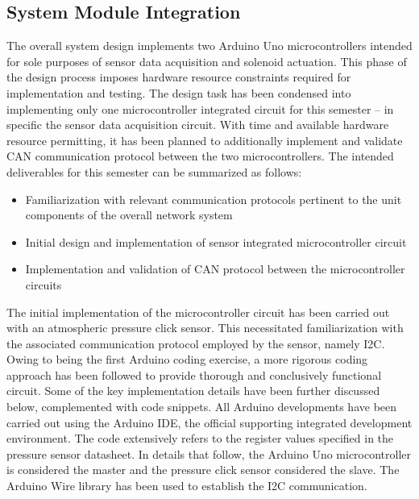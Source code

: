 \documentclass{article}
\begin{document}
\subsection{System Module Integration}
\begin{flushleft}
The overall system design implements two Arduino Uno microcontrollers intended for sole purposes of sensor data acquisition and solenoid actuation. This phase of the design process imposes hardware resource constraints required for implementation and testing. The design task has been condensed into implementing only one microcontroller integrated circuit for this semester – in specific the sensor data acquisition circuit. With time and available hardware resource permitting, it has been planned to additionally implement and validate CAN communication protocol between the two microcontrollers. The intended deliverables for this semester can be summarized as follows:
\end{flushleft}

\begin{itemize}
  \item Familiarization with relevant communication protocols pertinent to the unit components of the overall network system
  \item Initial design and implementation of sensor integrated microcontroller circuit
  \item Implementation and validation of CAN protocol between the microcontroller circuits
\end{itemize}

\begin{flushleft}
The initial implementation of the microcontroller circuit has been carried out with an atmospheric pressure click sensor. This necessitated familiarization with the associated communication protocol employed by the sensor, namely I2C. Owing to being the first Arduino coding exercise, a more rigorous coding approach has been followed to provide thorough and conclusively functional circuit. Some of the key implementation details have been further discussed below, complemented with code snippets. All Arduino developments have been carried out using the Arduino IDE, the official supporting integrated development environment. The code extensively refers to the register values specified in the pressure sensor datasheet. In details that follow, the Arduino Uno microcontroller is considered the master and the pressure click sensor considered the slave. The Arduino Wire library has been used to establish the I2C communication.
\end{flushleft}
\end{document}
